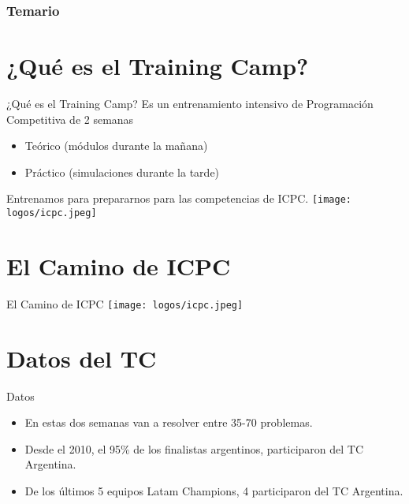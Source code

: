 \documentclass{beamer}
\begin{document}
\begin{frame}
\frametitle{Temario}
\tableofcontents
\end{frame}


\section{¿Qué es el Training Camp?}

\begin{frame}{¿Qué es el Training Camp?}
Es un entrenamiento intensivo de Programación Competitiva de 2 semanas
\begin{itemize}
    \item Teórico (módulos durante la mañana) 
    \item Práctico (simulaciones durante la tarde)
\end{itemize}
Entrenamos para prepararnos para las competencias de ICPC.
    \centering
    \texttt{[image: logos/icpc.jpeg]}
\end{frame}

\section{El Camino de ICPC}

\begin{frame}{El Camino de ICPC}
    \centering
    \texttt{[image: logos/icpc.jpeg]}

\end{frame}

\section{Datos del TC}
\begin{frame}{Datos}
    \begin{itemize}
        \item En estas dos semanas van a resolver entre 35-70 problemas.
        \item Desde el 2010, el 95\% de los finalistas argentinos, participaron del TC Argentina.
        \item De los últimos 5 equipos Latam Champions, 4 participaron del TC Argentina.
    \end{itemize}
\end{frame}
\end{document}
